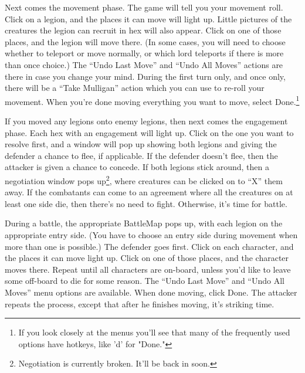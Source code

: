 \documentclass{article}
\begin{document}
Next comes the movement phase. The game will tell you your movement roll.
Click on a legion, and the places it can move will light up. Little pictures of
the creatures the legion can recruit in hex will also appear. Click on one of 
those places, and the legion will move there. (In some cases, you will need to 
choose whether to teleport or move normally, or which lord teleports if there 
is more than once choice.) The ``Undo Last Move'' and ``Undo All Moves'' 
actions are there in case you change your mind. During the first turn only, 
and once only, there will be a ``Take Mulligan'' action which you can use to 
re-roll your movement. When you're done moving everything you want to move, 
select Done.\footnote{If you look closely at the menus you'll see that many of 
the frequently used options have hotkeys, like 'd' for "Done."}

If you moved any legions onto enemy legions, then next comes the engagement
phase. Each hex with an engagement will light up. Click on the one you want
to resolve first, and a window will pop up showing both legions and giving the
defender a chance to flee, if applicable. If the defender doesn't flee, then
the attacker is given a chance to concede. If both legions stick around, then
a negotiation window pops up\footnote{Negotiation is currently broken.
It'll be back in soon.}, where creatures can be clicked on to ``X'' them
away. If the combatants can come to an agreement where all the creatures on
at least one side die, then there's no need to fight. Otherwise, it's time
for battle.

During a battle, the appropriate BattleMap pops up, with each legion on the
appropriate entry side. (You have to choose an entry side during movement
when more than one is possible.) The defender goes first. Click on each
character, and the places it can move light up. Click on one of those
places, and the character moves there. Repeat until all characters are
on-board, unless you'd like to leave some off-board to die for some reason.
The ``Undo Last Move'' and ``Undo All Moves'' menu options are available. When
done moving, click Done. The attacker repeats the process, except that 
after he finishes moving, it's striking time.
\end{document}
